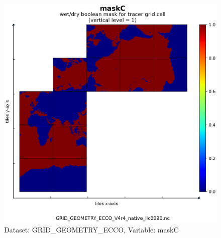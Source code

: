 \begin{figure}[H]
\centering
\includegraphics[scale=0.55]{../images/plots/native_plots_coords/Geometry_Parameters_for_the_Lat-Lon-Cap_90_(llc90)_Native_Model_Grid_(Version_4_Release_4)/maskC.png}
\caption{Dataset: GRID\_GEOMETRY\_ECCO, Variable: maskC}
\label{tab:table-GRID_GEOMETRY_ECCO_maskC-Plot}
\end{figure}
\newpage
\pagebreak
